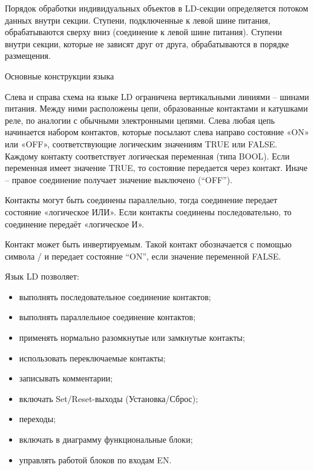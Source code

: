 \documentclass[letterpaper,10pt,russian]{sphinxmanual}
\begin{document}
Порядок обработки индивидуальных объектов в LD-секции определяется
потоком данных внутри секции. Ступени, подключенные к левой шине
питания, обрабатываются сверху вниз (соединение к левой шине питания).
Ступени внутри секции, которые не зависят друг от друга, обрабатываются
в порядке размещения.

Основные конструкции языка

Слева и справа схема на языке LD ограничена вертикальными линиями –
шинами питания. Между ними расположены цепи, образованные контактами и
катушками реле, по аналогии с обычными электронными цепями. Слева любая
цепь начинается набором контактов, которые посылают слева направо
состояние «ON» или «OFF», соответствующие логическим значениям TRUE или
FALSE. Каждому контакту соответствует логическая переменная (типа BOOL).
Если переменная имеет значение TRUE, то состояние передается через
контакт. Иначе – правое соединение получает значение выключено (``OFF'').

Контакты могут быть соединены параллельно, тогда соединение передает
состояние «логическое ИЛИ». Если контакты соединены последовательно, то
соединение передаёт «логическое И».

Контакт может быть инвертируемым. Такой контакт обозначается с помощью
символа \textbar{}/\textbar{} и передает состояние ``ON'', если значение переменной FALSE.

Язык LD позволяет:
\begin{itemize}
\item {} 
выполнять последовательное соединение контактов;

\item {} 
выполнять параллельное соединение контактов;

\item {} 
применять нормально разомкнутые или замкнутые контакты;

\item {} 
использовать переключаемые контакты;

\item {} 
записывать комментарии;

\item {} 
включать Set/Reset-выходы (Установка/Сброс);

\item {} 
переходы;

\item {} 
включать в диаграмму функциональные блоки;

\item {} 
управлять работой блоков по входам EN.

\end{itemize}
\end{document}

